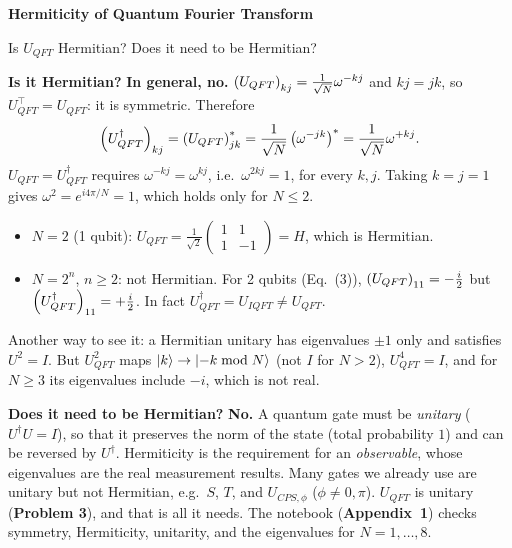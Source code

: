 \documentclass[a4paper, 10pt]{article}
\begin{document}
\newpage

\begin{problem}
\textbf{Hermiticity of Quantum Fourier Transform}
\par Is \( U_{QFT} \) Hermitian?
Does it need to be Hermitian?
\end{problem}

\begin{solution}
	\noindent \textbf{Is it Hermitian?} \textbf{In general, no.} \( \left(U_{QFT}\right)_{kj} = \tfrac{1}{\sqrt{N}}\omega^{-kj} \) and \( kj = jk \), so \( U_{QFT}^{\top} = U_{QFT} \): it is symmetric. Therefore
	\[
		\left(U_{QFT}^{\dagger}\right)_{kj} = \left(U_{QFT}\right)_{jk}^{*} = \frac{1}{\sqrt{N}}\left(\omega^{-jk}\right)^{*} = \frac{1}{\sqrt{N}}\omega^{+kj}.
	\]
	\( U_{QFT} = U_{QFT}^{\dagger} \) requires \( \omega^{-kj} = \omega^{kj} \), i.e.\ \( \omega^{2kj} = 1 \), for every \( k, j \). Taking \( k = j = 1 \) gives \( \omega^2 = e^{i4\pi/N} = 1 \), which holds only for \( N \le 2 \).
	\begin{itemize}
		\item \( N = 2 \) (1 qubit): \( U_{QFT} = \tfrac{1}{\sqrt{2}}\begin{pmatrix} 1 & 1 \\ 1 & -1 \end{pmatrix} = H \), which is Hermitian.
		\item \( N = 2^n \), \( n \ge 2 \): not Hermitian. For 2 qubits (Eq.~(3)), \( \left(U_{QFT}\right)_{11} = -\tfrac{i}{2} \) but \( \left(U_{QFT}^{\dagger}\right)_{11} = +\tfrac{i}{2} \). In fact \( U_{QFT}^{\dagger} = U_{IQFT} \neq U_{QFT} \).
	\end{itemize}
	Another way to see it: a Hermitian unitary has eigenvalues \( \pm 1 \) only and satisfies \( U^2 = I \). But \( U_{QFT}^2 \) maps \( \ket{k} \to \ket{-k \bmod N} \) (not \( I \) for \( N > 2 \)), \( U_{QFT}^4 = I \), and for \( N \ge 3 \) its eigenvalues include \( -i \), which is not real.

	\myspace

	\noindent \textbf{Does it need to be Hermitian?} \textbf{No.} A quantum gate must be \emph{unitary} (\( U^{\dagger}U = I \)), so that it preserves the norm of the state (total probability \( 1 \)) and can be reversed by \( U^{\dagger} \). Hermiticity is the requirement for an \emph{observable}, whose eigenvalues are the real measurement results.
	Many gates we already use are unitary but not Hermitian, e.g.\ \( S \), \( T \), and \( U_{CPS, \phi} \) (\( \phi \neq 0, \pi \)). \( U_{QFT} \) is unitary (\textbf{Problem 3}), and that is all it needs.
	The notebook (\textbf{Appendix~1}) checks symmetry, Hermiticity, unitarity, and the eigenvalues for \( N = 1, \dots, 8 \).
\end{solution}
\end{document}
